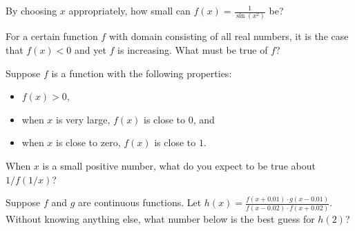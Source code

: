 \documentclass{ximera}
\begin{document}
\begin{shuffle}
\begin{problem}
  By choosing $x$ appropriately, how small can $f(x) = \frac{1}{\sin (x^2)}$ be?
  \begin{multipleChoice}
  \end{multipleChoice}
\end{problem}



\begin{problem}
  For a certain function $f$ with domain consisting of all real
  numbers, it is the case that $f(x) < 0$ and yet $f$ is increasing.
  What must be true of $f$?
  \begin{multipleChoice}
  \end{multipleChoice}
\end{problem}

\begin{problem}
  Suppose $f$ is a function with the following properties:
  \begin{itemize}
  \item $f(x) > 0$,
  \item when $x$ is very large, $f(x)$ is close to $0$, and
  \item when $x$ is close to zero, $f(x)$ is close to $1$.
  \end{itemize}
  When $x$ is a small positive number, what do you expect to be true about $1/f(1/x)$?
  \begin{multipleChoice}
  \end{multipleChoice}
\end{problem}

\begin{problem}
  Suppose $f$ and $g$ are continuous functions.  Let $h(x) = \frac{f(x+0.01) \cdot g(x - 0.01)}{f(x-0.02) \cdot f(x + 0.02)}$.  Without knowing anything else, what number below is the best guess for $h(2)$?
  \begin{multipleChoice}
  \end{multipleChoice}
\end{problem}


\end{shuffle}
\end{document}
